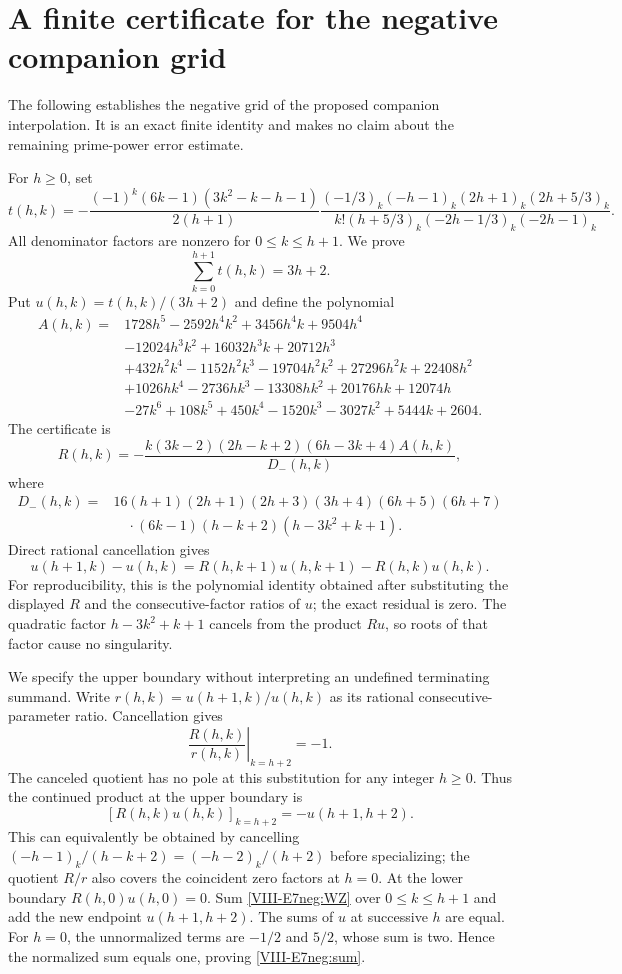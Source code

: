 \documentclass[11pt,letterpaper]{article}
\numberwithin{equation}{section}
\begin{document}
\section{A finite certificate for the negative companion grid}\label{loc-VIII-B}
\label{VIII-sec:E7negative}
The following establishes the negative grid of the proposed companion
interpolation. It is an exact finite identity and makes no claim about
the remaining prime-power error estimate.

For $h\ge0$, set
\[
 t(h,k)=-\frac{(-1)^k(6k-1)(3k^2-k-h-1)}{2(h+1)}
 \frac{(-1/3)_k(-h-1)_k(2h+1)_k(2h+5/3)_k}
 {k!(h+5/3)_k(-2h-1/3)_k(-2h-1)_k}.
\]
All denominator factors are nonzero for $0\le k\le h+1$.
We prove
\begin{equation}\label{VIII-E7neg:sum}
 \sum_{k=0}^{h+1}t(h,k)=3h+2.
\end{equation}
Put $u(h,k)=t(h,k)/(3h+2)$ and define the polynomial
\[
\begin{split}
 A(h,k)={}&1728h^5-2592h^4k^2+3456h^4k+9504h^4\\
 &-12024h^3k^2+16032h^3k+20712h^3\\
 &+432h^2k^4-1152h^2k^3-19704h^2k^2+27296h^2k+22408h^2\\
 &+1026hk^4-2736hk^3-13308hk^2+20176hk+12074h\\
 &-27k^6+108k^5+450k^4-1520k^3-3027k^2+5444k+2604.
\end{split}
\]
The certificate is
\[
 R(h,k)=-\frac{k(3k-2)(2h-k+2)(6h-3k+4)A(h,k)}{D_-(h,k)},
\]
where
\begin{align*}
 D_-(h,k)={}&16(h+1)(2h+1)(2h+3)(3h+4)(6h+5)(6h+7)\\
 &\quad\cdot(6k-1)(h-k+2)(h-3k^2+k+1).
\end{align*}
Direct rational cancellation gives
\begin{equation}\label{VIII-E7neg:WZ}
 u(h+1,k)-u(h,k)
 =R(h,k+1)u(h,k+1)-R(h,k)u(h,k).
\end{equation}
For reproducibility, this is the polynomial identity obtained after
substituting the displayed $R$ and the consecutive-factor ratios of
$u$; the exact residual is zero. The quadratic factor
$h-3k^2+k+1$ cancels from the product $Ru$, so roots of that factor
cause no singularity.

We specify the upper boundary without interpreting an undefined
terminating summand. Write $r(h,k)=u(h+1,k)/u(h,k)$ as its rational
consecutive-parameter ratio. Cancellation gives
\[
 \left.\frac{R(h,k)}{r(h,k)}\right|_{k=h+2}=-1.
\]
The canceled quotient has no pole at this substitution for any
integer $h\ge0$. Thus the continued product at the upper boundary is
\[
 [R(h,k)u(h,k)]_{k=h+2}=-u(h+1,h+2).
\]
This can equivalently be obtained by cancelling
$(-h-1)_k/(h-k+2)=(-h-2)_k/(h+2)$ before specializing; the quotient
$R/r$ also covers the coincident zero factors at $h=0$.
At the lower boundary $R(h,0)u(h,0)=0$.
Sum \eqref{VIII-E7neg:WZ} over $0\le k\le h+1$ and add the new endpoint
$u(h+1,h+2)$. The sums of $u$ at successive $h$ are equal.
For $h=0$, the unnormalized terms are $-1/2$ and $5/2$, whose sum
is two. Hence the normalized sum equals one, proving
\eqref{VIII-E7neg:sum}.
\end{document}
